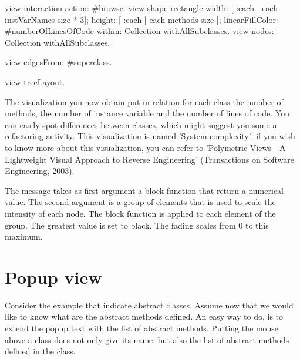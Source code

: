 \documentclass[a4paper,10pt,twoside]{book}
\begin{document}
\begin{code}{}
view interaction action: #browse.
view shape rectangle
  width: [ :each | each instVarNames size * 3];
  height: [ :each | each methods size ];
  linearFillColor: #numberOfLinesOfCode within: Collection withAllSubclasses.
view nodes: Collection withAllSubclasses.

view edgesFrom: #superclass.

view treeLayout.
\end{code}

The visualization you now obtain put in relation for each class the number of methods, the number of instance variable and the number of lines of code. You can easily spot differences between classes, which might suggest you some a refactoring activity. This visualization is named 'System complexity', if you wish to know more about this visualization, you can refer to 'Polymetric Views---A Lightweight Visual Approach to Reverse Engineering' (Transactions on Software Engineering, 2003). 

The message  takes as first argument a block function that return a numerical value. The second argument is a group of elements that is used to scale the intensity of each node. The block function is applied to each element of the group. The greatest value is set to black. The fading scales from 0 to this maximum.

\section{Popup view}
Consider the example that indicate abstract classes. Assume now that we would like to know what are the abstract methods defined. An easy way to do, is to extend the popup text with the list of abstract methods. Putting the mouse above a class does not only give its name, but also the list of abstract methods defined in the class.

\end{document}
